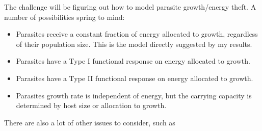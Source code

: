 \documentclass[11pt,reqno,final,pdftex]{amsart}\usepackage[]{graphicx}\usepackage[]{color}
\theoremstyle{plain}
\numberwithin{equation}{part}
\begin{document}
The challenge will be figuring out how to model parasite growth/energy theft. A number of possibilities spring to mind:
\begin{itemize}
\item Parasites receive a constant fraction of energy allocated to growth, regardless of their population size. This is the model directly suggested by my results.
\item Parasites have a Type I functional response on energy allocated to growth.
\item Parasites have a Type II functional response on energy allocated to growth.
\item Parasites growth rate is independent of energy, but the carrying capacity is determined by host size or allocation to growth.
\end{itemize}
There are also a lot of other issues to consider, such as
\end{document}
